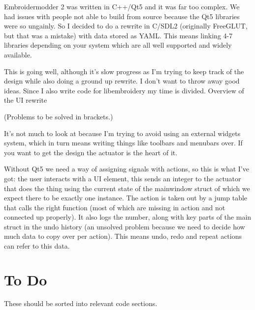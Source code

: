 Embroidermodder 2 was written in C++/Qt5 and it was far too complex. We had issues with people
not able to build from source because the Qt5 libraries were so ungainly. So I decided to do a
rewrite in C/SDL2 (originally FreeGLUT, but that was a mistake) with data stored as YAML. This
means linking 4-7 libraries depending on your system which are all well supported and widely available.

This is going well, although it's slow progress as I'm trying to keep track of the design while
also doing a ground up rewrite. I don't want to throw away good ideas. Since I also write code
for libembroidery my time is divided.
Overview of the UI rewrite

(Problems to be solved in brackets.)

It's not much to look at because I'm trying to avoid using an external
widgets system, which in turn means writing things like toolbars and menubars
over. If you want to get the design the actuator is the heart of it.

Without Qt5 we need a way of assigning signals with actions, so this is what
I've got: the user interacts with a UI element, this sends an integer to the
actuator that does the thing using the current state of the mainwindow struct
of which we expect there to be exactly one instance. The action is taken out
by a jump table that calls the right function (most of which are missing in
action and not connected up properly). It also logs the number, along with
key parts of the main struct in the undo history (an unsolved problem because
we need to decide how much data to copy over per action). This means undo,
redo and repeat actions can refer to this data.

\section{To Do}

These should be sorted into relevant code sections.

